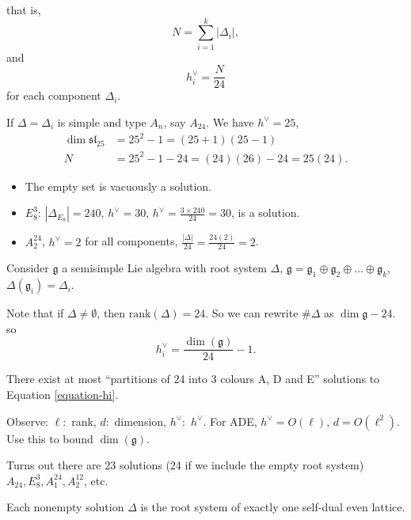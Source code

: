 \noindent
that is,
$$
N=\sum_{i=1}^k|\Delta_i|,
$$
and
$$
h_i^\vee=\frac{N}{24}
$$
for each component $\Delta_i$.

\begin{example}
\label{example-simple-root-systems}
If $\Delta=\Delta_i$ is simple and type
$A_n$,
say $A_{24}$. We have $h^\vee=25$,
$$
\begin{aligned}
\dim
\mathfrak{sl}_{25}&=25^2-1=(25+1)(25-1)\\
N&=25^2-1-24=(24)(26)-24=25(24).
\end{aligned}
$$
\end{example}

\begin{remark}
\label{remark-other-solutions}
\begin{itemize}
\item  The empty set is vacuously a solution.
\item $E_8^3$: $|\Delta_{E_8}|=240$,
$h^\vee=30$,
$h^\vee=\frac{3\times 240}{24}=30$, is a
solution.
\item $A_2^{24}$, $h^\vee=2$ for all
components,
$\frac{|\Delta|}{24}=\frac{24(2)}{24}=2$.
\end{itemize}
\end{remark}

\noindent
Consider $\mathfrak{g}$ a semisimple Lie
algebra with root system $\Delta$,
$\mathfrak{g}=\mathfrak{g}
_1\oplus\mathfrak{g}_2
\oplus \ldots
\oplus \mathfrak{g}_k$,
$\Delta(\mathfrak{g}_i)=\Delta_i$.

Note that if $\Delta\neq \emptyset$, then
$\text{rank}(\Delta)=24$.
So we can rewrite $\#\Delta$ as $\dim
\mathfrak{g}-24$.
so
\begin{equation}
\label{equation-hi}
h_i^\vee=\frac{\dim(\mathfrak{g})}{24}-1.
\end{equation}

\noindent
There exist at most ``partitions of 24 into 3
colours
A, D and E'' solutions to Equation
\ref{equation-hi}.

Observe: $\ell:$ rank, $d:$ dimension,
$h^\vee:$ $h^\vee$.
For ADE, $h^\vee=O(\ell)$, $d=O(\ell^2)$.
Use this to bound $\dim(\mathfrak{g})$.

Turns out there are 23 solutions (24 if we
include the
empty root system)
$A_{24},E_8^3,A_1^{24},A_2^{12}$, etc.

\begin{theorem}
\label{theorem-solutions}
Each nonempty solution $\Delta$ is the root
system
of exactly one self-dual even lattice.
\end{theorem}

